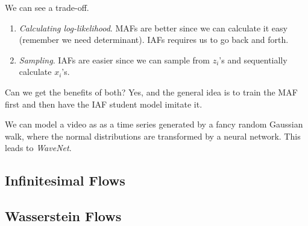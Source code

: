   We can see a trade-off. 
  \begin{enumerate}
    \item \textit{Calculating log-likelihood}. MAFs are better since we can calculate it easy (remember we need determinant). IAFs requires us to go back and forth. 
    \item \textit{Sampling}. IAFs are easier since we can sample from $z_i$'s and sequentially calculate $x_i$'s. 
  \end{enumerate}

  Can we get the benefits of both? Yes, and the general idea is to train the MAF first and then have the IAF student model imitate it. 

  \begin{example}
    We can model a video as as a time series generated by a fancy random Gaussian walk, where the normal distributions are transformed by a neural network. This leads to \textit{WaveNet}. 
  \end{example}

\subsection{Infinitesimal Flows} 

\subsection{Wasserstein Flows} 


